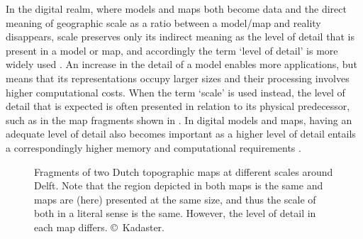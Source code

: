 In the digital realm, where models and maps both become data and the direct meaning of geographic scale as a ratio between a model/map and reality disappears, scale preserves only its indirect meaning as the level of detail that is present in a model or map, and accordingly the term `level of detail' is more widely used \citep{Biljecki14}.
An increase in the detail of a model enables more applications, but means that its representations occupy larger sizes and their processing involves higher computational costs.
When the term `scale' is used instead, the level of detail that is expected is often presented in relation to its physical predecessor, such as in the map fragments shown in .
In digital models and maps, having an adequate level of detail also becomes important as a higher level of detail entails a correspondingly higher memory and computational requirements \citep{Luebke03}.
\begin{figure}[tbp]
\centering
{}
\quad
{}
\caption[Topographic maps at different scales around Delft]{Fragments of two Dutch topographic maps at different scales around Delft. Note that the region depicted in both maps is the same and maps are (here) presented at the same size, and thus the scale of both in a literal sense is the same. However, the level of detail in each map differs. \copyright\ Kadaster\protect\footnotemark.}
\label{fig:generalisation}
\end{figure}

